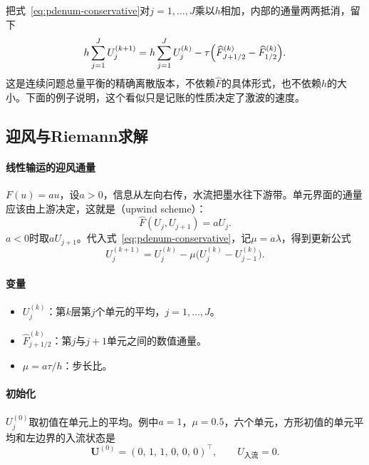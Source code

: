 把式~\eqref{eq:pdenum-conservative}对$j=1,\ldots,J$乘以$h$相加，内部的通量两两抵消，留下
\begin{equation}
 h\sum_{j=1}^JU_j^{(k+1)}=h\sum_{j=1}^JU_j^{(k)}-\tau\Bigl(\widehat{F}_{J+1/2}^{(k)}-\widehat{F}_{1/2}^{(k)}\Bigr).
 \label{eq:pdenum-telescoping}
\end{equation}
这是连续问题总量平衡的精确离散版本，不依赖$\widehat{F}$的具体形式，也不依赖$h$的大小。下面的例子说明，这个看似只是记账的性质决定了激波的速度。

\subsection{迎风与Riemann求解}
\label{sec:pdenum-upwind-riemann}

\paragraph{线性输运的迎风通量}
$F(u)=au$，设$a>0$，信息从左向右传，水流把墨水往下游带。单元界面的通量应该由上游决定，这就是（upwind scheme）：
\begin{equation}
 \widehat{F}(U_j,U_{j+1})=aU_j .
 \label{eq:pdenum-upwind-flux}
\end{equation}
$a<0$时取$aU_{j+1}$。代入式~\eqref{eq:pdenum-conservative}，记$\mu=a\lambda$，得到更新公式
\begin{equation}
 U_j^{(k+1)}=U_j^{(k)}-\mu\bigl(U_j^{(k)}-U_{j-1}^{(k)}\bigr).
 \label{eq:pdenum-upwind}
\end{equation}

\paragraph{变量}
\begin{itemize}
 \item $U_j^{(k)}$：第$k$层第$j$个单元的平均，$j=1,\ldots,J$。
 \item $\widehat{F}_{j+1/2}^{(k)}$：第$j$与$j+1$单元之间的数值通量。
 \item $\mu=a\tau/h$：步长比。
\end{itemize}

\paragraph{初始化}
$U_j^{(0)}$取初值在单元上的平均。例中$a=1$，$\mu=0.5$，六个单元，方形初值的单元平均和左边界的入流状态是
\[
 \bm{U}^{(0)}=(0,\,1,\,1,\,0,\,0,\,0)^\top,\qquad U_{\text{入流}}=0 .
\]

